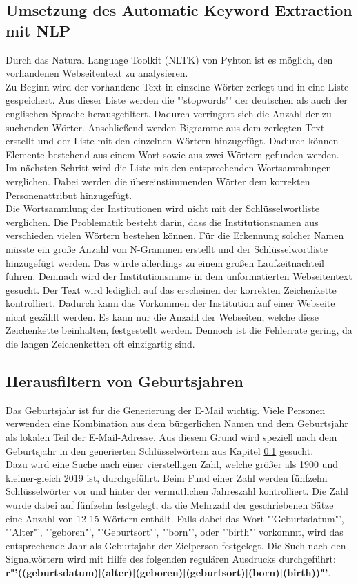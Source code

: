 	\subsection{Umsetzung des Automatic Keyword Extraction mit NLP}
		\label{subsec:AutomaticKeywordExtractionNLP}
		Durch das Natural Language Toolkit (NLTK) von Pyhton ist es möglich, den vorhandenen Webseitentext zu analysieren.\\
		Zu Beginn wird der vorhandene Text in einzelne Wörter zerlegt und in eine Liste gespeichert. Aus dieser Liste werden die "'stopwords"' der deutschen als auch der englischen Sprache herausgefiltert. Dadurch verringert sich die Anzahl der zu suchenden Wörter. Anschließend werden Bigramme aus dem zerlegten Text erstellt und der Liste mit den einzelnen Wörtern hinzugefügt. Dadurch können Elemente bestehend aus einem Wort sowie aus zwei Wörtern gefunden werden.\\
		Im nächsten Schritt wird die Liste mit den entsprechenden Wortsammlungen verglichen. Dabei werden die übereinstimmenden Wörter dem korrekten Personenattribut hinzugefügt.\\
		Die Wortsammlung der Institutionen wird nicht mit der Schlüsselwortliste verglichen. Die Problematik besteht darin, dass die Institutionsnamen aus verschieden vielen Wörtern bestehen können. Für die Erkennung solcher Namen müsste ein große Anzahl von N-Grammen erstellt und der Schlüsselwortliste hinzugefügt werden. Das würde allerdings zu einem großen Laufzeitnachteil führen. Demnach wird der Institutionsname in dem unformatierten Webseitentext gesucht. Der Text wird lediglich auf das erscheinen der korrekten Zeichenkette kontrolliert. Dadurch kann das Vorkommen der Institution auf einer Webseite nicht gezählt werden. Es kann nur die Anzahl der Webseiten, welche diese Zeichenkette beinhalten, festgestellt werden. Dennoch ist die Fehlerrate gering, da die langen Zeichenketten oft einzigartig sind.
		

	\subsection{Herausfiltern von Geburtsjahren}
		Das Geburtsjahr ist für die Generierung der E-Mail wichtig. Viele Personen verwenden eine Kombination aus dem bürgerlichen Namen und dem Geburtsjahr als lokalen Teil der E-Mail-Adresse. Aus diesem Grund wird speziell nach dem Geburtsjahr in den generierten Schlüsselwörtern aus Kapitel \ref{subsec:AutomaticKeywordExtractionNLP} gesucht.\\
		Dazu wird eine Suche nach einer vierstelligen Zahl, welche größer als 1900 und kleiner-gleich 2019 ist, durchgeführt. Beim Fund einer Zahl werden  fünfzehn Schlüsselwörter vor und hinter der vermutlichen Jahreszahl kontrolliert. Die Zahl wurde dabei auf fünfzehn festgelegt, da die Mehrzahl der geschriebenen Sätze eine Anzahl von 12-15 Wörtern enthält. \cite{seibicke1969schreibt} Falls dabei das Wort "'Geburtsdatum"', "'Alter"', "'geboren"', "'Geburtsort"', "'born"', oder "'birth"' vorkommt, wird das entsprechende Jahr als Geburtsjahr der Zielperson festgelegt. Die Such nach den Signalwörtern wird mit Hilfe des folgenden regulären Ausdrucks durchgeführt:
		\textbf{r"'((geburtsdatum)|(alter)|(geboren)|(geburtsort)|(born)|(birth))"'}.
		
